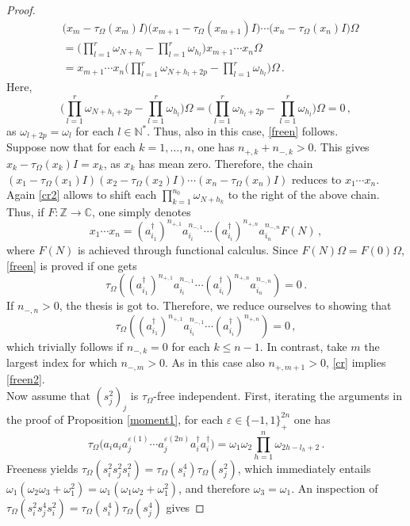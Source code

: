 \documentclass[12pt]{amsart}
\numberwithin{equation}{section}
\def\bc{{\mathbb C}}
\def\bn{{\mathbb N}}
\def\bz{{\mathbb Z}}
\def\eps{\varepsilon}
\def\t{\tau}
\def\om{\omega} \def\Om{\Omega}
\theoremstyle{definition}
\begin{document}
\begin{proof}
\begin{align*}
&(x_{m}-\t_\Om(x_{m})I\big)\big(x_{m+1}-\t_\Om(x_{m+1})I\big)\cdots\big(x_{n}-\t_\Om(x_{n})I\big)\Om\\
&= \bigg(\prod_{l=1}^r\om_{N+h_l}-\prod_{l=1}^r\om_{h_l}\bigg)x_{m+1}\cdots x_n\Om\\
&=x_{m+1}\cdots x_n\bigg(\prod_{l=1}^r\om_{N+h_l+2p}-\prod_{l=1}^r\om_{h_l}\bigg)\Om\,.
\end{align*}
Here,
$$
\displaystyle{\bigg(\prod_{l=1}^r\om_{N+h_l+2p}-\prod_{l=1}^r\om_{h_l}\bigg)\Om=\bigg(\prod_{l=1}^r\om_{h_l+2p}-\prod_{l=1}^r\om_{h_l}\bigg)\Om}=0\,,
$$
as $\om_{l+2p}=\om_l$ for each $l\in\bn^*$. Thus, also in this case, \eqref{freen} follows.\\
Suppose now that for each $k=1,\ldots, n$, one has $n_{+,k}+n_{-,k}>0$. This gives $x_k-\t_\Om(x_k)I=x_k$, as $x_k$ has mean zero. Therefore, the chain $(x_1-\t_\Om(x_1)I)(x_2-\t_\Om(x_2)I)\cdots (x_n-\t_\Om(x_n)I)$ reduces to $x_1\cdots x_n$. Again \eqref{cr2} allows to shift each $\prod_{k=1}^{n_0}\om_{N+h_k}$ to the right of the above chain. Thus, if $F:\bz\rightarrow \bc$, one simply denotes
$$
x_1\cdots x_n=(a^\dag_{i_1})^{n_{+,1}}a_{i_i}^{n_{-,1}}\cdots (a^\dag_{i_i})^{n_{+,n}}a_{i_n}^{n_{-,n}}F(N)\,,
$$
where $F(N)$ is achieved through functional calculus.
Since $F(N)\Om=F(0)\Om$, \eqref{freen} is proved if one gets
$$
\t_\Om((a^\dag_{i_1})^{n_{+,1}}a_{i_i}^{n_{-,1}}\cdots (a^\dag_{i_i})^{n_{+,n}}a_{i_n}^{n_{-,n}})=0\,.
$$
If $n_{-,n}>0$, the thesis is got to. Therefore, we reduce ourselves to showing that
\begin{equation}\label{freen2}
\t_\Om((a^\dag_{i_1})^{n_{+,1}}a_{i_i}^{n_{-,1}}\cdots (a^\dag_{i_i})^{n_{+,n}})=0\,,
\end{equation}
which trivially follows if $n_{-,k}=0$ for each $k\leq n-1$. In contrast, take $m$ the largest index for which $n_{-,m}>0$. As in this case also $n_{+,m+1}>0$, \eqref{cr} implies \eqref{freen2}.\\
Now assume that $(s_j^2)_j$ is $\tau_\Om$-free independent. First, iterating the arguments in the proof of Proposition \ref{moment1}, for each $\eps\in\{-1,1\}^{2n}_+$ one has
\begin{equation}\label{dep2}
\t_\Om\big(a_ia_ia^{\eps(1)}_j \cdots a^{\eps(2n)}_j a_i^\dag a_i^\dag\big)=\om_1\om_2\prod_{h=1}^n \om_{2h-l_h+2}\,.
\end{equation}
Freeness yields $\t_\Om(s_i^2s_j^{2}s_i^2)=\t_\Om(s_i^4)\t_\Om(s_j^{2})$, which immediately entails $\om_1(\om_2\om_3+\om_1^2)=\om_1(\om_1\om_2+\om_1^2)$, and therefore $\om_3=\om_1$. An inspection of $\t_\Om(s_i^2s_j^{4}s_i^2)=\t_\Om(s_i^4)\t_\Om(s_j^{4})$ gives

\end{proof}
\end{document}
